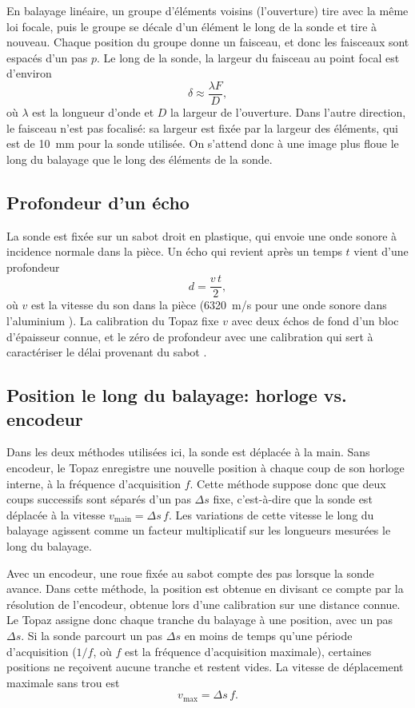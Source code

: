 \documentclass[11pt,letterpaper]{article}
\newcommand{\beq}[1]{\begin{equation} \label{#1}}
\def\enq{\end{equation}}
\begin{document}
En balayage linéaire, un groupe d'éléments voisins (l'ouverture) tire avec la même loi focale, puis le groupe se décale d'un élément le long de la sonde et tire à nouveau. Chaque position du groupe donne un faisceau, et donc les faisceaux sont espacés d'un pas $p$. Le long de la sonde, la largeur du faisceau au point focal est d'environ \cite{olympus}
\beq{eq:largeur}
    \delta \approx \frac{\lambda F}{D} ,
\enq
où $\lambda$ est la longueur d'onde et $D$ la largeur de l'ouverture. Dans l'autre direction, le faisceau n'est pas focalisé: sa largeur est fixée par la largeur des éléments, qui est de 10~mm pour la sonde utilisée. On s'attend donc à une image plus floue le long du balayage que le long des éléments de la sonde.

\subsection{Profondeur d'un écho}

La sonde est fixée sur un sabot droit en plastique, qui envoie une onde sonore à incidence normale dans la pièce. Un écho qui revient après un temps $t$ vient d'une profondeur
\beq{eq:profondeur}
    d = \frac{v\,t}{2} ,
\enq
où $v$ est la vitesse du son dans la pièce (6320~m/s pour une onde sonore dans l'aluminium \cite{krautkramer}). La calibration du Topaz fixe $v$ avec deux échos de fond d'un bloc d'épaisseur connue, et le zéro de profondeur avec une calibration qui sert à caractériser le délai provenant du sabot \cite{protocole_topaz}.

\subsection{Position le long du balayage: horloge vs. encodeur}
\label{sec:theorie_position}

Dans les deux méthodes utilisées ici, la sonde est déplacée à la main. Sans encodeur, le Topaz enregistre une nouvelle position à chaque coup de son horloge interne, à la fréquence d'acquisition $f$. Cette méthode suppose donc que deux coups successifs sont séparés d'un pas $\Delta s$ fixe, c'est-à-dire que la sonde est déplacée à la vitesse $v_{\text{main}} = \Delta s\, f$. Les variations de cette vitesse le long du balayage agissent comme un facteur multiplicatif sur les longueurs mesurées le long du balayage.

Avec un encodeur, une roue fixée au sabot compte des pas lorsque la sonde avance. Dans cette méthode, la position est obtenue en divisant ce compte par la résolution de l'encodeur, obtenue lors d'une calibration sur une distance connue. Le Topaz assigne donc chaque tranche du balayage à une position, avec un pas $\Delta s$. Si la sonde parcourt un pas $\Delta s$ en moins de temps qu'une période d'acquisition ($1/f$, où $f$ est la fréquence d'acquisition maximale), certaines positions ne reçoivent aucune tranche et restent vides. La vitesse de déplacement maximale sans trou est
\beq{eq:vmax}
    v_{\max} = \Delta s\, f .
\enq
\end{document}
